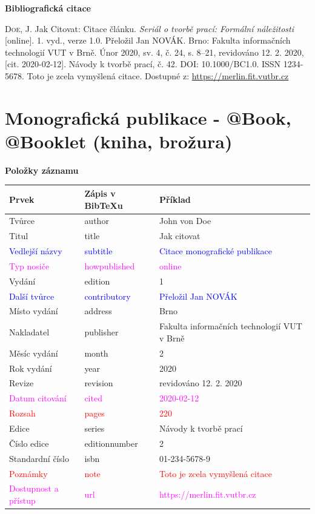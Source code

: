 \bigskip

\noindent \textbf{Bibliografická citace}

\medskip

\noindent \textsc{Doe}, J. Jak Citovat: Citace článku. \textit{Seriál o tvorbě prací: Formální náležitosti} [online]. 1. vyd., verze 1.0. Přeložil Jan NOVÁK. Brno: Fakulta informačních technologií VUT v Brně. Únor 2020, sv. 4, č. 24, s. 8–21, revidováno 12. 2. 2020, [cit. 2020-02-12]. Návody k tvorbě prací, č. 42. DOI: 10.1000/BC1.0. ISSN 1234-5678. Toto je zcela vymyšlená citace. Dostupné z: \url{https://merlin.fit.vutbr.cz}

\newpage
\section*{Monografická publikace - @Book, @Booklet (kniha, brožura)}
\label{pr-monografie}
\noindent \textbf{Položky záznamu}

\medskip

\begin{tabularx}{\linewidth}{X X X}
    Prvek & Zápis v BibTeXu & Příklad\\\hline
    Tvůrce & author & John von Doe\\
    Titul & title & Jak citovat\\
    \textcolor{blue}{Vedlejší názvy} & \textcolor{blue}{subtitle} & \textcolor{blue}{Citace monografické publikace}\\
    \textcolor{magenta}{Typ nosiče} & \textcolor{magenta}{howpublished} & \textcolor{magenta}{online}\\
    Vydání & edition & 1\\
    \textcolor{blue}{Další tvůrce} & \textcolor{blue}{contributory} & \textcolor{blue}{Přeložil Jan NOVÁK}\\
    Místo vydání & address & Brno\\
    Nakladatel & publisher & Fakulta informačních technologií VUT v Brně\\
    Měsíc vydání & month & 2\\
    Rok vydání & year & 2020\\
    Revize & revision & revidováno 12. 2. 2020\\
    \textcolor{magenta}{Datum citování} & \textcolor{magenta}{cited} & \textcolor{magenta}{2020-02-12}\\
    \textcolor{red}{Rozsah} & \textcolor{red}{pages} & \textcolor{red}{220}\\
    Edice & series & Návody k tvorbě prací\\
    Číslo edice & editionnumber & 2\\
    Standardní číslo & isbn & 01-234-5678-9\\
    \textcolor{red}{Poznámky} & \textcolor{red}{note} & \textcolor{red}{Toto je zcela vymyšlená citace}\\
    \textcolor{magenta}{Dostupnost a přístup} & \textcolor{magenta}{url} & \textcolor{magenta}{https://merlin.fit.vutbr.cz}\\
\end{tabularx}

